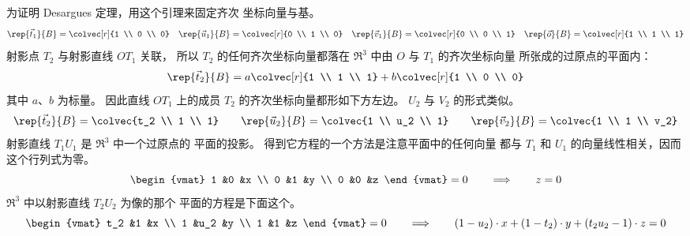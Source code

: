 为证明 Desargues 定理，用这个引理来固定齐次
坐标向量与基。
\begin{equation*}
  \rep{\vec{t}_1}{B}=\colvec[r]{1 \\ 0 \\ 0}
  \quad
  \rep{\vec{u}_1}{B}=\colvec[r]{0 \\ 1 \\ 0}
  \quad
  \rep{\vec{v}_1}{B}=\colvec[r]{0 \\ 0 \\ 1}
  \quad
  \rep{\vec{o}}{B}=\colvec[r]{1 \\ 1 \\ 1}    
\end{equation*}
射影点 $T_2$ 与射影直线 $OT_1$ 关联，
所以 $T_2$ 的任何齐次坐标向量都落在 $\Re^3$ 中由
$O$ 与 $T_1$ 的齐次坐标向量
所张成的过原点的平面内：
\begin{equation*}
  \rep{\vec{t}_2}{B}=a\colvec[r]{1 \\ 1 \\ 1}
                           +b\colvec[r]{1 \\ 0 \\ 0}
\end{equation*}
其中 $a$、$b$ 为标量。
因此直线
$OT_1$ 上的成员 $T_2$ 的齐次坐标向量都形如下方左边。 
$U_2$ 与 $V_2$ 的形式类似。
\begin{equation*}
  \rep{\vec{t}_2}{B}=\colvec{t_2 \\ 1 \\ 1}
  \qquad
  \rep{\vec{u}_2}{B}=\colvec{1 \\ u_2 \\ 1}
  \qquad
  \rep{\vec{v}_2}{B}=\colvec{1 \\ 1 \\ v_2}
\end{equation*}
射影直线 $T_1U_1$ 是 $\Re^3$ 中一个过原点的
平面的投影。
得到它方程的一个方法是注意平面中的任何向量
都与 $T_1$ 和
$U_1$ 的向量线性相关，因而这个行列式为零。
\begin{equation*}
  \begin{vmat}
    1  &0  &x  \\
    0  &1  &y  \\
    0  &0  &z
  \end{vmat}=0
  \qquad
  \Longrightarrow
  \qquad
  z=0
\end{equation*}
$\Re^3$ 中以射影直线 $T_2U_2$ 为像的那个
平面的方程是下面这个。
\begin{equation*}
  \begin{vmat}
    t_2  &1    &x  \\
    1    &u_2  &y  \\
    1    &1    &z
  \end{vmat}=0
  \qquad
  \Longrightarrow
  \qquad
  (1-u_2)\cdot x+(1-t_2)\cdot y+(t_2u_2-1)\cdot z=0
\end{equation*}
